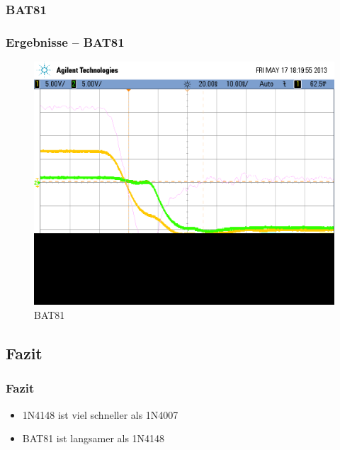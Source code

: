 \subsubsection{BAT81}
\begin{frame}
\frametitle{Ergebnisse -- BAT81}
  \begin{figure}
    \includegraphics[width=0.7\columnwidth]{fig/scope_20_2.png}
    \caption{BAT81}
  \end{figure}
\end{frame}

\subsection{Fazit}
\begin{frame}
\frametitle{Fazit}
  \begin{itemize}
    \item 1N4148 ist viel schneller als 1N4007
    \item BAT81 ist langsamer als 1N4148
  \end{itemize}
\end{frame}
